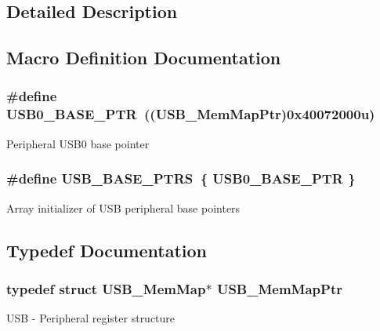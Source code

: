\subsection{Detailed Description}


\subsection{Macro Definition Documentation}
\hypertarget{group___u_s_b___peripheral_ga598ff5eb20a0551af232710b3f27640a}{}
\subsubsection[{U\+S\+B0\+\_\+\+B\+A\+S\+E\+\_\+\+P\+T\+R}]{\setlength{\rightskip}{0pt plus 5cm}\#define U\+S\+B0\+\_\+\+B\+A\+S\+E\+\_\+\+P\+T\+R~(({\bf U\+S\+B\+\_\+\+Mem\+Map\+Ptr})0x40072000u)}\label{group___u_s_b___peripheral_ga598ff5eb20a0551af232710b3f27640a}
Peripheral U\+S\+B0 base pointer \hypertarget{group___u_s_b___peripheral_gabb481a231c7c57907377d7ee985f826c}{}
\subsubsection[{U\+S\+B\+\_\+\+B\+A\+S\+E\+\_\+\+P\+T\+R\+S}]{\setlength{\rightskip}{0pt plus 5cm}\#define U\+S\+B\+\_\+\+B\+A\+S\+E\+\_\+\+P\+T\+R\+S~\{ {\bf U\+S\+B0\+\_\+\+B\+A\+S\+E\+\_\+\+P\+T\+R} \}}\label{group___u_s_b___peripheral_gabb481a231c7c57907377d7ee985f826c}
Array initializer of U\+S\+B peripheral base pointers 

\subsection{Typedef Documentation}
\hypertarget{group___u_s_b___peripheral_gaabd989a49827dc34abb5de32732f4125}{}
\subsubsection[{U\+S\+B\+\_\+\+Mem\+Map\+Ptr}]{\setlength{\rightskip}{0pt plus 5cm}typedef struct {\bf U\+S\+B\+\_\+\+Mem\+Map}$\ast$ {\bf U\+S\+B\+\_\+\+Mem\+Map\+Ptr}}\label{group___u_s_b___peripheral_gaabd989a49827dc34abb5de32732f4125}
U\+S\+B -\/ Peripheral register structure 